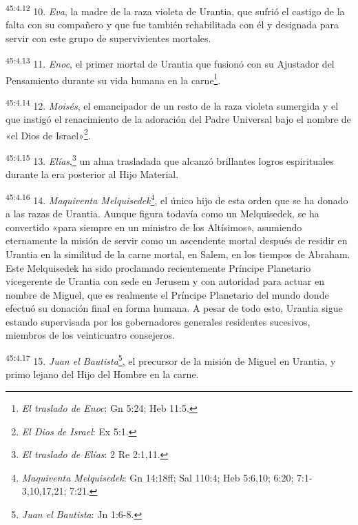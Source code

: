 \par
\textsuperscript{45:4.12} 10. \textit{Eva}, la madre de la raza violeta de Urantia, que sufrió el castigo de la falta con su compañero y que fue también rehabilitada con él y designada para servir con este grupo de supervivientes mortales.

\par
\textsuperscript{45:4.13} 11. \textit{Enoc}, el primer mortal de Urantia que fusionó con su Ajustador del Pensamiento durante su vida humana en la carne\footnote{\textit{El traslado de Enoc}: Gn 5:24; Heb 11:5.}.

\par
\textsuperscript{45:4.14} 12. \textit{Moisés}, el emancipador de un resto de la raza violeta sumergida y el que instigó el renacimiento de la adoración del Padre Universal bajo el nombre de «el Dios de Israel»\footnote{\textit{El Dios de Israel}: Ex 5:1.}.

\par
\textsuperscript{45:4.15} 13. \textit{Elías},\footnote{\textit{El traslado de Elías}: 2 Re 2:1,11.} un alma trasladada que alcanzó brillantes logros espirituales durante la era posterior al Hijo Material.

\par
\textsuperscript{45:4.16} 14. \textit{Maquiventa Melquisedek}\footnote{\textit{Maquiventa Melquisedek}: Gn 14:18ff; Sal 110:4; Heb 5:6,10; 6:20; 7:1-3,10,17,21; 7:21.}, el único hijo de esta orden que se ha donado a las razas de Urantia. Aunque figura todavía como un Melquisedek, se ha convertido «para siempre en un ministro de los Altísimos», asumiendo eternamente la misión de servir como un ascendente mortal después de residir en Urantia en la similitud de la carne mortal, en Salem, en los tiempos de Abraham. Este Melquisedek ha sido proclamado recientemente Príncipe Planetario vicegerente de Urantia con sede en Jerusem y con autoridad para actuar en nombre de Miguel, que es realmente el Príncipe Planetario del mundo donde efectuó su donación final en forma humana. A pesar de todo esto, Urantia sigue estando supervisada por los gobernadores generales residentes sucesivos, miembros de los veinticuatro consejeros.

\par
\textsuperscript{45:4.17} 15. \textit{Juan el Bautista}\footnote{\textit{Juan el Bautista}: Jn 1:6-8.}, el precursor de la misión de Miguel en Urantia, y primo lejano del Hijo del Hombre en la carne.

